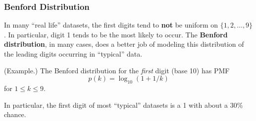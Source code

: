 \documentclass[letterpaper]{article}
\begin{document}
\subsubsection{Benford Distribution}
In many ``real life'' datasets, the first digits tend to \textbf{not} be uniform on $\{1, 2, \dots, 9\}$. In particular, digit 1 tends to be the most likely to occur. The \textbf{Benford distribution}, in many cases, does a better job of modeling this distribution of the leading digits occurring in ``typical'' data. 

\begin{mdframed}[]
    (Example.) The Benford distribution for the \emph{first} digit (base 10) has PMF 
    \[p(k) = \log_{10}(1 + 1/k)\]
    for $1 \leq k \leq 9$.
\end{mdframed}
In particular, the first digit of most ``typical'' datasets is a 1 with about a 30\% chance. 
\end{document}
